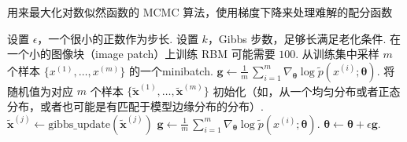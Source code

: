 


\begin{algorithm}
\begin{algorithmic}
\caption{用来最大化对数似然函数的 MCMC 算法，使用梯度下降来处理难解的配分函数}
\label{alg:mcmc}
\STATE 设置 $\epsilon$，一个很小的正数作为步长.
\STATE 设置 $k$，Gibbs 步数，足够长满足老化条件. 在一个小的图像块（image patch）上训练 RBM 可能需要 $100$.
	\STATE 从训练集中采样 $m$ 个样本 $\{x^{(1)},\dots,x^{(m)}\}$ 的一个\gls{minibatch}.
	\STATE $\mathbf{g} \leftarrow \frac{1}{m}\,\sum_{i = 1}^{m} \nabla_{\pmb{\theta}} \log\tilde{p}(x^{(i)};\pmb{\theta})$.
	\STATE 将随机值为对应 $m$ 个样本 $\{\tilde{\mathbf{x}}^{(1)},\dots,\tilde{\mathbf{x}}^{(m)}\}$ 初始化（如，从一个均匀分布或者正态分布，或者也可能是有匹配于模型边缘分布的分布）.
		\STATE $\tilde{\mathbf{x}}^{(j)} \leftarrow \mathrm{gibbs\_update}(\tilde{\mathbf{x}}^{(j)})$
		\ENDFOR
	\ENDFOR
	\STATE $\mathbf{g} \leftarrow \frac{1}{m}\,\sum_{i = 1}^{m} \nabla_{\pmb{\theta}} \log\tilde{p}(x^{(i)};\pmb{\theta})$.
	\STATE $\pmb{\theta} \leftarrow \pmb{\theta} + \epsilon \mathbf{g}$.
\ENDWHILE

\end{algorithmic}
\end{algorithm}


